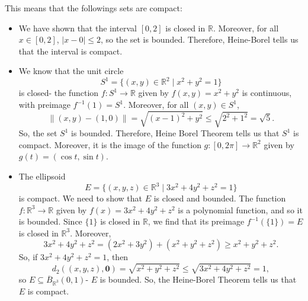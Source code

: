 \documentclass[a4paper, openany]{memoir}
\theoremstyle{definition}
\theoremstyle{plain}
\begin{document}
This means that the followings sets are compact:
\begin{itemize}
    \item We have shown that the interval $[0, 2]$ is closed in $\mathbb{R}$. Moreover, for all $x \in [0, 2]$, $|x-0| \leqslant 2$, so the set is bounded. Therefore, Heine-Borel tells us that the interval is compact.
    
    \item We know that the unit circle 
    \[S^1 = \{(x, y) \in \mathbb{R}^2 \mid x^2 + y^2 = 1\}\]
    is closed- the function $f: S^1 \to \mathbb{R}$ given by $f(x, y) = x^2 + y^2$ is continuous, with preimage $f^{-1}(1) = S^1$. Moreover, for all $(x, y) \in S^1$, 
    \[\lVert (x, y) - (1, 0) \rVert = \sqrt{(x-1)^2 + y^2} \leqslant \sqrt{2^2 + 1^2} = \sqrt{5}.\]
    So, the set $S^1$ is bounded. Therefore, Heine Borel Theorem tells us that $S^1$ is compact. Moreover, it is the image of the function $g: [0, 2\pi] \to \mathbb{R}^2$ given by $g(t) = (\cos t, \sin t)$.
    
    \item The ellipsoid
    \[E = \{(x, y, z) \in \mathbb{R}^3 \mid 3x^2 + 4y^2 + z^2 = 1\}\]
    is compact. We need to show that $E$ is closed and bounded. The function $f: \mathbb{R}^3 \to \mathbb{R}$ given by $f(x) = 3x^2 + 4y^2 + z^2$ is a polynomial function, and so it is bounded. Since $\{1\}$ is closed in $\mathbb{R}$, we find that its preimage $f^{-1}(\{1\}) = E$ is closed in $\mathbb{R}^3$. Moreover, 
    \[3x^2 + 4y^2 + z^2 = (2x^2 + 3y^2) + (x^2 + y^2 + z^2) \geqslant x^2 + y^2 + z^2.\]
    So, if $3x^2 + 4y^2 + z^2 = 1$, then
    \[d_2((x, y, z), \bm{0}) = \sqrt{x^2 + y^2 + z^2} \leqslant \sqrt{3x^2 + 4y^2 + z^2} = 1,\]
    so $E \subseteq \overline{B}_{\mathbb{R}^3}(0, 1)$- $E$ is bounded. So, the Heine-Borel Theorem tells us that $E$ is compact.
\end{itemize}
\end{document}
